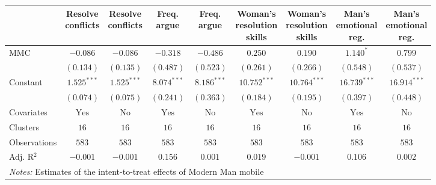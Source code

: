 
\begin{tabular}{l c c c c c c c c}
\toprule
 & \shortstack{Resolve \\ conflicts} & \shortstack{Resolve \\ conflicts} & \shortstack{Freq. \\ argue} & \shortstack{Freq. \\ argue} & \shortstack{Woman's \\ resolution \\ skills} & \shortstack{Woman's \\ resolution \\ skills} & \shortstack{Man's \\ emotional \\ reg.} & \shortstack{Man's \\ emotional \\ reg.} \\
\midrule
MMC          & $-0.086$       & $-0.086$      & $-0.318$       & $-0.486$      & $0.250$        & $0.190$        & $1.140^{*}$    & $0.799$        \\
             & $(0.134)$      & $(0.135)$     & $(0.487)$      & $(0.523)$     & $(0.261)$      & $(0.266)$      & $(0.548)$      & $(0.537)$      \\
Constant     & $1.525^{***}$  & $1.525^{***}$ & $8.074^{***}$  & $8.186^{***}$ & $10.752^{***}$ & $10.764^{***}$ & $16.739^{***}$ & $16.914^{***}$ \\
             & $(0.074)$      & $(0.075)$     & $(0.241)$      & $(0.363)$     & $(0.184)$      & $(0.195)$      & $(0.397)$      & $(0.448)$      \\
\midrule
Covariates   & $\textrm{Yes}$ & $\textrm{No}$ & $\textrm{Yes}$ & $\textrm{No}$ & $\textrm{Yes}$ & $\textrm{No}$  & $\textrm{Yes}$ & $\textrm{No}$  \\
Clusters     & $16$           & $16$          & $16$           & $16$          & $16$           & $16$           & $16$           & $16$           \\
Observations & $583$          & $583$         & $583$          & $583$         & $583$          & $583$          & $583$          & $583$          \\
Adj. R$^2$   & $-0.001$       & $-0.001$      & $0.156$        & $0.001$       & $0.019$        & $-0.001$       & $0.106$        & $0.002$        \\
\bottomrule
\multicolumn{9}{l}{\scriptsize{\parbox{\linewidth}{\vspace{2pt}
       \textit{Notes:} Estimates of the intent-to-treat effects of Modern Man mobile
}}}
\end{tabular}
